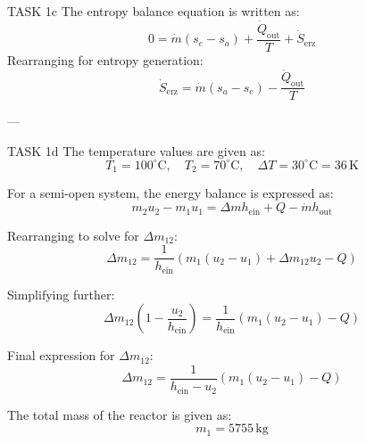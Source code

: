 TASK 1c  
The entropy balance equation is written as:  
\[
0 = \dot{m}(s_e - s_a) + \frac{\dot{Q}_{\text{out}}}{T} + \dot{S}_{\text{erz}}
\]  
Rearranging for entropy generation:  
\[
\dot{S}_{\text{erz}} = \dot{m}(s_a - s_e) - \frac{\dot{Q}_{\text{out}}}{T}
\]  

---

TASK 1d  
The temperature values are given as:  
\[
T_1 = 100^\circ\text{C}, \quad T_2 = 70^\circ\text{C}, \quad \Delta T = 30^\circ\text{C} = 36 \, \text{K}
\]  

For a semi-open system, the energy balance is expressed as:  
\[
m_2 u_2 - m_1 u_1 = \Delta m h_{\text{ein}} + Q - \dot{m} h_{\text{out}}
\]  

Rearranging to solve for \( \Delta m_{12} \):  
\[
\Delta m_{12} = \frac{1}{h_{\text{ein}}} \left( m_1 (u_2 - u_1) + \Delta m_{12} u_2 - Q \right)
\]  

Simplifying further:  
\[
\Delta m_{12} \left( 1 - \frac{u_2}{h_{\text{ein}}} \right) = \frac{1}{h_{\text{ein}}} \left( m_1 (u_2 - u_1) - Q \right)
\]  

Final expression for \( \Delta m_{12} \):  
\[
\Delta m_{12} = \frac{1}{h_{\text{ein}} - u_2} \left( m_1 (u_2 - u_1) - Q \right)
\]  

The total mass of the reactor is given as:  
\[
m_1 = 5755 \, \text{kg}
\]